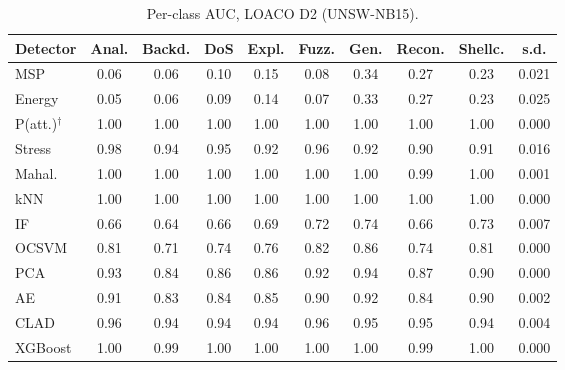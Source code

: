 \begin{table}[!t]
\centering
\scriptsize
\setlength{\tabcolsep}{2.6pt}
\caption{Per-class AUC, LOACO D2 (UNSW-NB15).}
\label{tab:a_l2}
\begin{tabular}{lccccccccc}
\toprule
Detector & Anal. & Backd. & DoS & Expl. & Fuzz. & Gen. & Recon. & Shellc. & s.d.\\
\midrule
MSP & 0.06 & 0.06 & 0.10 & 0.15 & 0.08 & 0.34 & 0.27 & 0.23 & 0.021\\
Energy & 0.05 & 0.06 & 0.09 & 0.14 & 0.07 & 0.33 & 0.27 & 0.23 & 0.025\\
P(att.)$^\dagger$ & 1.00 & 1.00 & 1.00 & 1.00 & 1.00 & 1.00 & 1.00 & 1.00 & 0.000\\
\midrule
Stress & 0.98 & 0.94 & 0.95 & 0.92 & 0.96 & 0.92 & 0.90 & 0.91 & 0.016\\
Mahal. & 1.00 & 1.00 & 1.00 & 1.00 & 1.00 & 1.00 & 0.99 & 1.00 & 0.001\\
kNN & 1.00 & 1.00 & 1.00 & 1.00 & 1.00 & 1.00 & 1.00 & 1.00 & 0.000\\
\midrule
IF & 0.66 & 0.64 & 0.66 & 0.69 & 0.72 & 0.74 & 0.66 & 0.73 & 0.007\\
OCSVM & 0.81 & 0.71 & 0.74 & 0.76 & 0.82 & 0.86 & 0.74 & 0.81 & 0.000\\
PCA & 0.93 & 0.84 & 0.86 & 0.86 & 0.92 & 0.94 & 0.87 & 0.90 & 0.000\\
AE & 0.91 & 0.83 & 0.84 & 0.85 & 0.90 & 0.92 & 0.84 & 0.90 & 0.002\\
\midrule
CLAD & 0.96 & 0.94 & 0.94 & 0.94 & 0.96 & 0.95 & 0.95 & 0.94 & 0.004\\
\midrule
XGBoost & 1.00 & 0.99 & 1.00 & 1.00 & 1.00 & 1.00 & 0.99 & 1.00 & 0.000\\
\bottomrule
\end{tabular}
\end{table}

